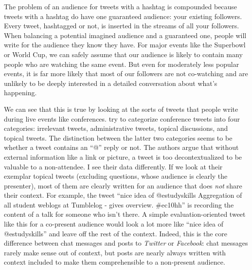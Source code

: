 The problem of an audience for tweets with a hashtag is compounded because tweets with a hashtag do have one guaranteed audience: your existing followers. Every tweet, hashtagged or not, is inserted in the streams of all your followers. When balancing a potential imagined audience and a guaranteed one, people will write for the audience they know they have. For major events like the Superbowl or World Cup, we can safely assume that our audience is likely to contain many people who are watching the same event. But even for moderately less popular events, it is far more likely that most of our followers are not co-watching and are unlikely to be deeply interested in a detailed conversation about what's happening. 

We can see that this is true by looking at the sorts of tweets that people write during live events like conferences. \citet{Ebner:2010tx} try to categorize conference tweets into four categories: irrelevant tweets, administrative tweets, topical discussions, and topical tweets. The distinction between the latter two categories seems to be whether a tweet contains an ``@'' reply or not. The authors argue that without external information like a link or picture, a tweet is too decontextualized to be valuable to a non-attendee. I see their data differently. If we look at their exemplar topical tweets (excluding questions, whose audience is clearly the presenter), most of them are clearly written for an audience that does \emph{not} share their context.  For example, the tweet ``nice idea of @estudyskills Aggregation of all student weblogs at Tumblelog - gives overview. \#ec10hh'' is recording the content of a talk for someone who isn't there. A simple evaluation-oriented tweet like this for a co-present audience would look a lot more like ``nice idea of @estudyskills'' and leave off the rest of the context. Indeed, this is the core difference between chat messages and posts to \emph{Twitter} or \emph{Facebook}: chat messages rarely make sense out of context, but posts are nearly always written with context included to make them comprehensible to a non-present audience. 


